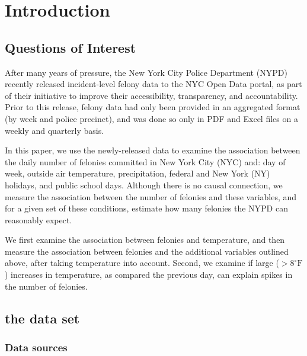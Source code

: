 \documentclass[12pt,notitlepage]{article}
\newcommand{\degf}{^\circ\text{F}}
\begin{document}
\pagebreak

\singlespacing



\section{Introduction}


\subsection{Questions of Interest}

After many years of pressure, the New York City Police Department (NYPD) recently released incident-level felony data to the NYC Open Data portal, as part of their initiative to improve their accessibility, transparency, and accountability. Prior to this release, felony data had only been provided in an aggregated format (by week and police precinct), and was done so only in PDF and Excel files on a weekly and quarterly basis.

In this paper, we use the newly-released data to examine the association between the daily number of felonies committed in New York City (NYC) and: day of week, outside air temperature, precipitation, federal and New York (NY) holidays, and public school days. Although there is no causal connection, we measure the association between the number of felonies and these variables, and for a given set of these conditions, estimate how many felonies the NYPD can reasonably expect.

We first examine the association between felonies and temperature, and then measure the association between felonies and the additional variables outlined above, after taking temperature into account. Second, we examine if large ($>8 \degf$) increases in temperature, as compared the previous day, can explain spikes in the number of felonies.



\subsection{the data set}

\subsubsection{Data sources}
\end{document}
